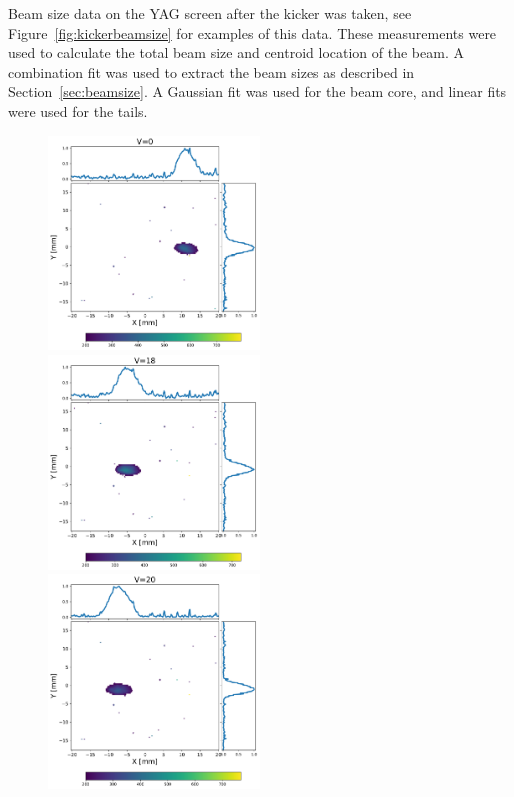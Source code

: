 Beam size data on the YAG screen after the kicker was taken, 
see Figure~\ref{fig:kickerbeamsize} for examples of this data. 
These measurements were used to calculate the total beam size and 
centroid location of the beam. A combination fit was used to extract 
the beam sizes as described in Section~\ref{sec:beamsize}. 
A Gaussian fit was used for the beam core, and linear fits were used for the tails.
\begin{figure}
	\includegraphics[width=0.5\textwidth]{./images/yag6_kicker_voltage0}%
	\includegraphics[width=0.5\textwidth]{./images/yag6_kicker_voltage18}\\
	\includegraphics[width=0.5\textwidth]{./images/yag6_kicker_voltage20}%

\end{figure}
